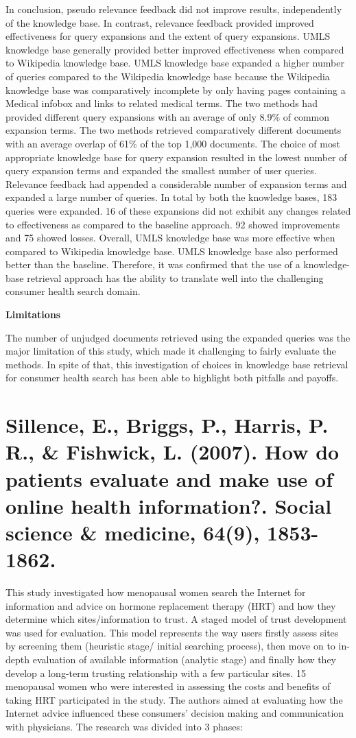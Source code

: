 \documentclass[]{article}
\begin{document}
In conclusion, pseudo relevance feedback did not improve results, independently of the knowledge base. In contrast, relevance feedback provided improved effectiveness for query expansions and the extent of query expansions. UMLS knowledge base generally provided better improved effectiveness when compared to Wikipedia knowledge base. UMLS knowledge base expanded a higher number of queries compared to the Wikipedia knowledge base because the Wikipedia knowledge base was comparatively incomplete by only having pages containing a Medical infobox and links to related medical terms. The two methods had provided different query expansions with an average of only 8.9\% of common expansion terms. The two methods retrieved comparatively different documents with an average overlap of 61\% of the top 1,000 documents. The choice of most appropriate knowledge base for query expansion resulted in the lowest number of query expansion terms and expanded the smallest number of user queries. Relevance feedback had appended a considerable number of expansion terms and expanded a large number of queries.  In total by both the knowledge bases, 183 queries were expanded. 16 of these expansions did not exhibit any changes related to effectiveness as compared to the baseline approach. 92 showed improvements and 75 showed losses. Overall, UMLS knowledge base was more effective when compared to Wikipedia knowledge base. UMLS knowledge base also performed better than the baseline. Therefore, it was confirmed that the use of a knowledge-base retrieval approach has the ability to translate well into the challenging consumer health search domain.                 

\textbf{Limitations}

The number of unjudged documents retrieved using the expanded queries was the major limitation of this study, which made it challenging to fairly evaluate the methods. In spite of that, this investigation of choices in knowledge base retrieval for consumer health search has been able to highlight both pitfalls and payoffs.

\section{Sillence, E., Briggs, P., Harris, P. R., \& Fishwick, L. (2007). How do patients evaluate and make use of online health information?. Social science \& medicine, 64(9), 1853-1862.} 

This study investigated how menopausal women search the Internet for information and advice on hormone replacement therapy (HRT) and how they determine which sites/information to trust. A staged model of trust development was used for evaluation. This model represents the way users firstly assess sites by screening them (heuristic stage/ initial searching process), then move on to in-depth evaluation of available information (analytic stage) and finally how they develop a long-term trusting relationship with a few particular sites. 15 menopausal women who were interested in assessing the costs and benefits of taking HRT participated in the study. The authors aimed at evaluating how the Internet advice influenced these consumers' decision making and communication with physicians. The research was divided into 3 phases:
\end{document}
